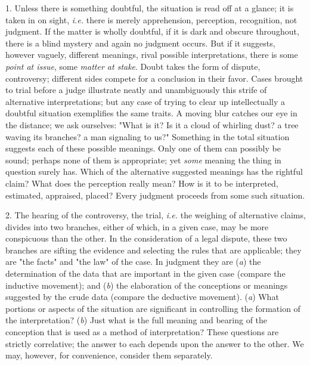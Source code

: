 \documentclass[letterpaper]{book}
\begin{document}
1. Unless there is something doubtful, the situation is read off at a
glance; it is taken in on sight, \emph{i.e.} there is merely
apprehension, perception, recognition, not judgment. If the matter is
wholly doubtful, if it is dark and obscure throughout, there is a blind
mystery and again no judgment occurs. But if it suggests, however
vaguely, different meanings, rival possible interpretations, there is
some \emph{point at issue}, some \emph{matter at stake}. Doubt takes the
form of dispute, controversy; different sides compete for a conclusion
in their favor. Cases brought to trial before a judge illustrate neatly
and unambiguously this strife of alternative interpretations; but any
case of trying to clear up intellectually a doubtful situation
exemplifies the same traits. A moving blur catches our eye in the
distance; we ask ourselves: "What is it? Is it a cloud of whirling dust?
a tree waving its branches? a man signaling to us?" Something in the
total situation suggests each of these possible meanings. Only one of
them can possibly be sound; perhaps none of them is appropriate; yet
\emph{some} meaning the thing in question surely has. Which of the
alternative suggested meanings has the rightful claim? What does the
perception really mean? How is it to be interpreted, estimated,
appraised, placed? Every judgment proceeds from some such situation.


2. The hearing of the controversy, the trial, \emph{i.e.} the weighing
of alternative claims, divides into two branches, either of which, in a
given case, may be more conspicuous than the other. In the consideration
of a legal dispute, these two branches are sifting the evidence
and
selecting the rules that are applicable; they are "the facts" and "the
law" of the case. In judgment they are (\emph{a}) the determination of
the data that are important in the given case (compare the inductive
movement); and (\emph{b}) the elaboration of the conceptions or meanings
suggested by the crude data (compare the deductive movement). (\emph{a})
What portions or aspects of the situation are significant in controlling
the formation of the interpretation? (\emph{b}) Just what is the full
meaning and bearing of the conception that is used as a method of
interpretation? These questions are strictly correlative; the answer to
each depends upon the answer to the other. We may, however, for
convenience, consider them separately.

\end{document}
